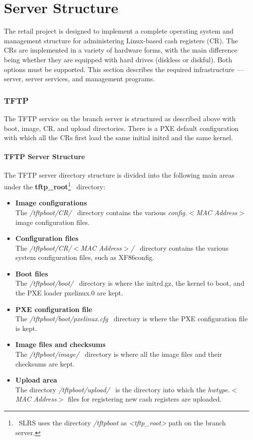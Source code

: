 \chapter{Server Structure}
\label{server}
\minitoc

The retail project is designed to implement a complete operating system
and management structure for administering Linux-based cash registers (CR).
The CRs are implemented in a variety of hardware forms, with the main difference
being whether they are equipped with hard drives (diskless or diskful).
Both options must be supported.
This section describes the required infrastructure --- server, server services,
and management programs.

\subsection{TFTP}
\label{tftp}
The TFTP service on the branch server is structured as described above with boot,
image, CR, and upload directories. There is a PXE default configuration with which all
the CRs first load the same initial initrd and the same kernel.

\subsubsection{TFTP Server Structure}
The TFTP server directory structure is divided into the following main areas under
the \textbf{tftp\_root}\footnote{~SLRS uses the directory \textit{/tftpboot} as \textit{<tftp\_root>} path
on the branch server.}~ directory:

\begin{itemize}
\item \textbf{Image configurations}\\
      The \textit{/tftpboot/CR/}~ directory contains the various \textit{config.$<$MAC Address$>$}
      image configuration files.
\item \textbf{Configuration files}\\
      The \textit{/tftpboot/CR/$<$MAC Address$>$/}~ directory contains the various system configuration
      files, such as XF86config.
\item \textbf{Boot files}\\
      The \textit{/tftpboot/boot/}~ directory is where the initrd.gz, the kernel to boot, and the
      PXE loader pxelinux.0 are kept.
\item \textbf{PXE configuration file}\\
      The \textit{/tftpboot/boot/pxelinux.cfg}~ directory is where the PXE configuration file is kept.
\item \textbf{Image files and checksums}\\
      The \textit{/tftpboot/image/}~ directory is where all the image files and their checksums are kept.
\item \textbf{Upload area}\\
      The directory \textit{/tftpboot/upload/}~ is the directory into which the
      \textit{hwtype.$<$MAC Address$>$}
      files for registering new cash registers are uploaded.
\end{itemize}
